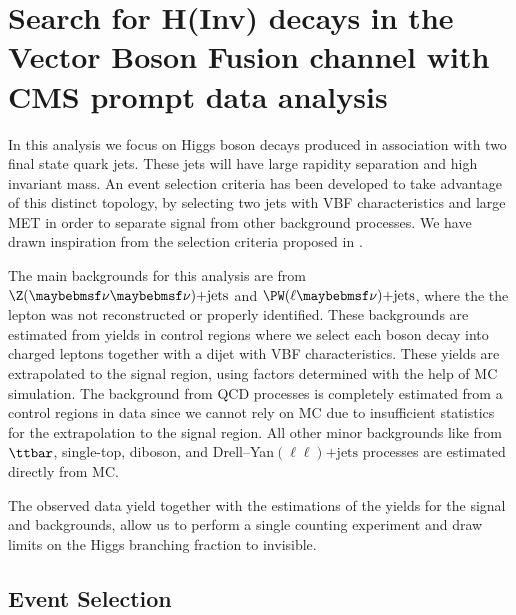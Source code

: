 \chapter{Search for H(Inv) decays in the Vector Boson Fusion channel with CMS prompt data analysis}
\label{CHAPTER:PromptDataAnalysis}

\glsresetall %


In this analysis we focus on Higgs boson decays produced in association with two final state quark jets. These jets will have large rapidity separation and high invariant mass. An event selection criteria has been developed to take advantage of this distinct topology, by selecting two jets with \gls{VBF} characteristics and large \gls{MET} in order to separate signal from other background processes. We have drawn inspiration from the selection criteria proposed in \cite{ARTICLE:Zeppenfeld_ObservingAnInvisibleHiggsboson}.

The main backgrounds for this analysis are from $\Z (\nu \nu)\text{+jets}$ and $\PW (\ell \nu)\text{+jets}$, where the the lepton was not reconstructed or properly identified. These backgrounds are estimated from yields in control regions where we select each boson decay into charged leptons together with a dijet with \gls{VBF} characteristics. These yields are extrapolated to the signal region, using factors determined with the help of \gls{MC} simulation. The background from \gls{QCD} processes is completely estimated from a control regions in data since we cannot rely on \gls{MC} due to insufficient statistics for the extrapolation to the signal region. All other minor backgrounds like from $\ttbar$, single-top, diboson, and Drell--Yan$(\ell\ell)\text{+jets}$ processes are estimated directly from \gls{MC}. 

The observed data yield together with the estimations of the yields for the signal and backgrounds, allow us to perform a single counting experiment and draw limits on the Higgs branching fraction to invisible.

\section{Event Selection}


